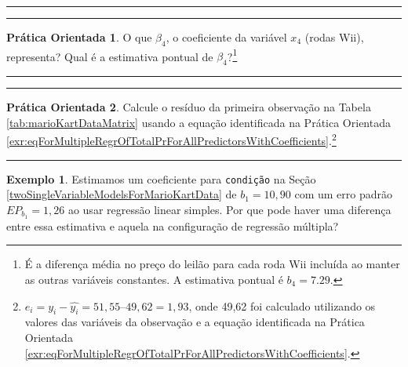 \documentclass[
]{book}
\theoremstyle{definition}
\theoremstyle{definition}
\newtheorem{example}{Exemplo}[chapter]
\theoremstyle{definition}
\newtheorem{exercise}{Prática Orientada}[chapter]
\theoremstyle{definition}
\theoremstyle{remark}
\begin{document}
\begin{center}\rule{0.5\linewidth}{0.5pt}\end{center}

\begin{center}\rule{0.5\linewidth}{0.5pt}\end{center}

\begin{exercise}
\protect\hypertarget{exr:unnamed-chunk-287}{}{\label{exr:unnamed-chunk-287} }O que \(\beta_4\), o coeficiente da variável \(x_4\) (rodas Wii), representa? Qual é a estimativa pontual de \(\beta_4\)?\footnote{É a diferença média no preço do leilão para cada roda Wii incluída ao manter as outras variáveis constantes. A estimativa pontual é \(b_4 = 7.29\).}
\end{exercise}

\begin{center}\rule{0.5\linewidth}{0.5pt}\end{center}

\begin{center}\rule{0.5\linewidth}{0.5pt}\end{center}

\begin{exercise}
\protect\hypertarget{exr:computeMultipleRegressionResidualForMarioKart}{}{\label{exr:computeMultipleRegressionResidualForMarioKart} }Calcule o resíduo da primeira observação na Tabela \ref{tab:marioKartDataMatrix} usando a equação identificada na Prática Orientada \ref{exr:eqForMultipleRegrOfTotalPrForAllPredictorsWithCoefficients}.\footnote{\(e_i = y_i - \hat{y_i} = 51,55 – 49,62 = 1,93\), onde 49,62 foi calculado utilizando os valores das variáveis da observação e a equação identificada na Prática Orientada \ref{exr:eqForMultipleRegrOfTotalPrForAllPredictorsWithCoefficients}.}
\end{exercise}

\begin{center}\rule{0.5\linewidth}{0.5pt}\end{center}

\begin{example}
\protect\hypertarget{exm:colinearityOfCondNewAndStockPhoto}{}{\label{exm:colinearityOfCondNewAndStockPhoto} }Estimamos um coeficiente para \texttt{condição} na Seção \ref{twoSingleVariableModelsForMarioKartData} de \(b_1 = 10,90\) com um erro padrão \(EP_{b_1} = 1,26\) ao usar regressão linear simples. Por que pode haver uma diferença entre essa estimativa e aquela na configuração de regressão múltipla?
\end{example}
\end{document}
